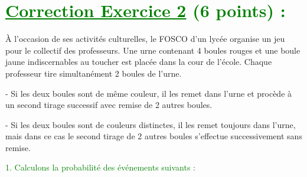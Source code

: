 \documentclass[12pt]{article}
\begin{document}
\section*{\textcolor{green}{\underline{Correction Exercice 2} (6 points) :}}
À l’occasion de ses activités culturelles, le FOSCO d’un lycée organise un jeu pour le collectif des professeurs. Une urne contenant 4 boules rouges et une boule jaune indiscernables au toucher est placée dans la cour de l’école. Chaque professeur tire simultanément 2 boules de l’urne.

- Si les deux boules sont de même couleur, il les remet dans l’urne et procède à un second tirage successif avec remise de 2 autres boules.

- Si les deux boules sont de couleurs distinctes, il les remet toujours dans l’urne, mais dans ce cas le second tirage de 2 autres boules s’effectue successivement sans remise.

\textcolor{green}{1. Calculons la probabilité des événements suivants :}
\end{document}
